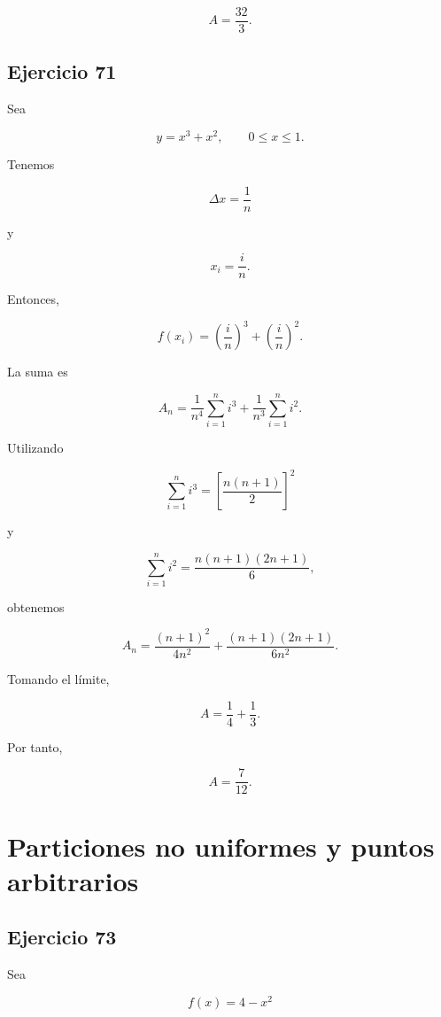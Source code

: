 \documentclass[12pt]{article}
\begin{document}
\[
\boxed{
A=\frac{32}{3}
}.
\]

\subsection*{Ejercicio 71}

Sea

\[
y=x^3+x^2,
\qquad
0\leq x\leq1.
\]

Tenemos

\[
\Delta x=\frac1n
\]

y

\[
x_i=\frac{i}{n}.
\]

Entonces,

\[
f(x_i)
=
\left(\frac{i}{n}\right)^3
+
\left(\frac{i}{n}\right)^2.
\]

La suma es

\[
A_n
=
\frac{1}{n^4}
\sum_{i=1}^{n}i^3
+
\frac{1}{n^3}
\sum_{i=1}^{n}i^2.
\]

Utilizando

\[
\sum_{i=1}^{n}i^3
=
\left[
\frac{n(n+1)}2
\right]^2
\]

y

\[
\sum_{i=1}^{n}i^2
=
\frac{n(n+1)(2n+1)}6,
\]

obtenemos

\[
A_n
=
\frac{(n+1)^2}{4n^2}
+
\frac{(n+1)(2n+1)}{6n^2}.
\]

Tomando el límite,

\[
A
=
\frac14+\frac13.
\]

Por tanto,

\[
\boxed{
A=\frac{7}{12}
}.
\]

\section*{Particiones no uniformes y puntos arbitrarios}

\subsection*{Ejercicio 73}

Sea

\[
f(x)=4-x^2
\]
\end{document}
